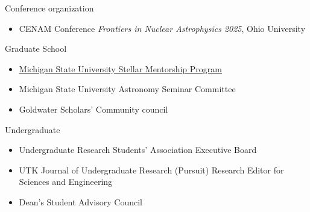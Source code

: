 \documentclass[11pt]{vitae}
\begin{document}
\begin{genericlist}
\item Conference organization
  \begin{itemize}
    \item[] CENAM Conference \emph{Frontiers in Nuclear Astrophysics 2025}, Ohio University
  \end{itemize}
\item Graduate School
  \begin{itemize}
      \item[] \href{https://astro.natsci.msu.edu/personal-and-professional-support/stellar-mentorship-program.aspx}{Michigan State University Stellar Mentorship Program}
      \item Michigan State University Astronomy Seminar Committee
      \item Goldwater Scholars' Community council
  \end{itemize}
\item Undergraduate
  \begin{itemize}
    \item Undergraduate Research Students' Association Executive Board
    \item UTK Journal of Undergraduate Research (Pursuit) Research Editor for Sciences and Engineering
    \item Dean's Student Advisory Council
  \end{itemize}
\end{genericlist}



\end{document}
